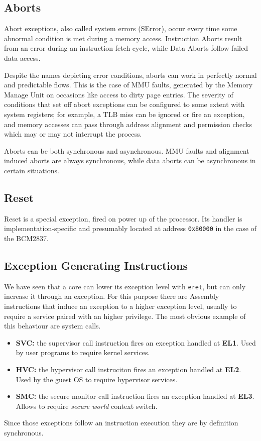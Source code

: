 \documentclass[12pt,a4paper,openright,twoside]{report}
\begin{document}

\subsection{Aborts}
Abort exceptions, also called system errors (SError), occur every time some abnormal
condition is met during a memory access. Instruction Aborts result from an error
during an instruction fetch cycle, while Data Aborts follow failed data access.

Despite the names depicting error conditions, aborts can work in perfectly normal
and predictable flows. This is the case of MMU faults, generated by the Memory
Manage Unit on occasions like access to dirty page entries.
The severity of conditions that set off abort exceptions can be configured to 
some extent with system registers; for example, a TLB miss can be ignored or 
fire an exception, and memory accesses can pass through address alignment 
and permission checks which may or may not interrupt the process.

Aborts can be both synchronous and asynchronous. MMU faults and alignment induced 
aborts are always synchronous, while data aborts can be asynchronous in certain
situations.

\subsection{Reset}
Reset is a special exception, fired on power up of the processor. Its handler is 
implementation-specific and presumably located at address {\tt 0x80000} in the 
case of the BCM2837.

\subsection{Exception Generating Instructions}
We have seen that a core can lower its exception level with {\tt eret}, but can
only increase it through an exception. For this purpose there are Assembly instructions
that induce an exception to a higher exception level, usually to require a service 
paired with an higher privilege. The most obvious example of this behaviour are
system calls.
\begin{itemize}
    \item \textbf{SVC:} the supervisor call instruction fires an exception
        handled at \textbf{EL1}. Used by user programs to require kernel services.
    \item \textbf{HVC:} the hypervisor call instruciton fires an exception
        handled at \textbf{EL2}. Used by the guest OS to require hypervisor services.
    \item \textbf{SMC:} the secure monitor call instruction fires an exception
        handled at \textbf{EL3}. Allows to require \textit{secure world} context
        switch.
\end{itemize}
Since those exceptions follow an instruction execution they are by definition
synchronous.
\end{document}

